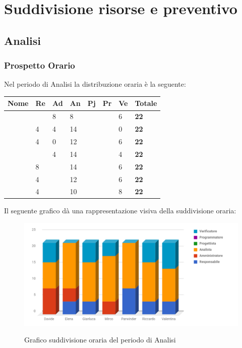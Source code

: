 \documentclass[PianoDiProgetto.tex]{subfiles}
\begin{document}
\chapter{Suddivisione risorse e preventivo}
\section{Analisi}
\subsection{Prospetto Orario}
Nel periodo di Analisi la distribuzione oraria è la seguente:
\begin{center}

\begin{table}[htbp]
	\centering
	\renewcommand\arraystretch{1.5}
	\begin{tabularx}{\textwidth}{p{4cm}|p{1cm}|p{1cm}|p{1cm}|p{1cm}|p{1cm}|p{1cm}|p{2cm}}
		\hline
		\textbf{Nome} & \textbf{Re} & \textbf{Ad} & \textbf{An} & \textbf{Pj} & \textbf{Pr} & \textbf{Ve} & \textbf{Totale} \\
		\hline
		\Davide & \ & 8 & 8 & \ & \ & 6 & \textbf{22} \\
		\hline
		\Elena & 4 & 4 & 14 & \ & \ & 0 & \textbf{22} \\
		\hline
		\Gianluca & 4 & 0 & 12 & \ & \ & 6 & \textbf{22} \\
		\hline
		\Mirco & \ & 4 & 14 & \ & \ & 4 & \textbf{22} \\
		\hline
		\Parwinder & 8 & \ & 14 & \ & \ & 6 & \textbf{22} \\
		\hline
		\Riccardo & 4 & \ & 12 & \ & \ & 6 & \textbf{22} \\
		\hline
		\Valentina & 4 & \ & 10 & \ & \ & 8 & \textbf{22} \\
		\hline
	\end{tabularx}
\end{table} 
\newpage	
\end{center}
Il seguente grafico dà una rappresentazione visiva della suddivisione oraria:
\begin{figure}[h]
	\includegraphics[width=14.5cm]{images/prospettoOrario/analisi.png}
	\label{fig:foo}
	\caption{Grafico suddivisione oraria del periodo di Analisi}
\end{figure} 
\end{document}
